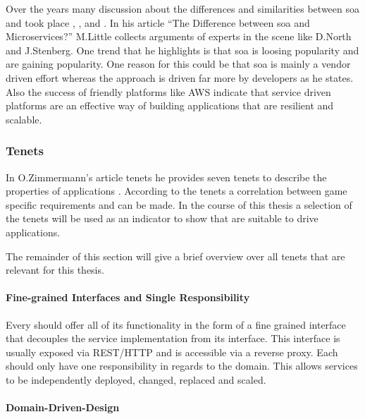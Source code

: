 Over the years many discussion about the differences and similarities between
\gls{soa} and \mss{} took place \cite{little2017soaVSms},
\cite{ogradly2017soaVSms}, and \cite{little2015soaVSms}. In his article ``The
Difference between \gls{soa} and Microservices?'' M.Little collects arguments of
experts in the \ms{} scene like D.North \cite{north2015mss} and
J.Stenberg\cite{stenberg2014mss}. One trend that he highlights is that \gls{soa}
is loosing popularity and \mss{} are gaining popularity. One reason for this
could be that \gls{soa} is mainly a vendor driven effort whereas the \ms{}
approach is driven far more by developers as he states. Also the success of
\ms{} friendly platforms like AWS indicate that service driven platforms are an
effective way of building applications that are resilient and scalable.

\subsubsection{\ms{} Tenets}

In O.Zimmermann's article \ms{} tenets he provides seven \ms{} tenets to
describe the properties of \ms{} applications
\cite{zimmermann2016microservices}. According to the tenets a correlation
between game specific requirements and \ogs{} can be made. In the course of this
thesis a selection of the \ms{} tenets will be used as an indicator to show
that \mss{} are suitable to drive \og{} applications.

The remainder of this section will give a brief overview over all \ms{} tenets
that are relevant for this thesis.

\paragraph{Fine-grained Interfaces and Single Responsibility}

Every \ms{} should offer all of its functionality in the form of a fine grained
interface that decouples the service implementation from its interface. This
interface is usually exposed via REST/HTTP and is accessible via a reverse
proxy. Each \ms{} should only have one responsibility in regards to the domain.
This allows services to be independently deployed, changed, replaced and scaled.

\paragraph{Domain-Driven-Design}

